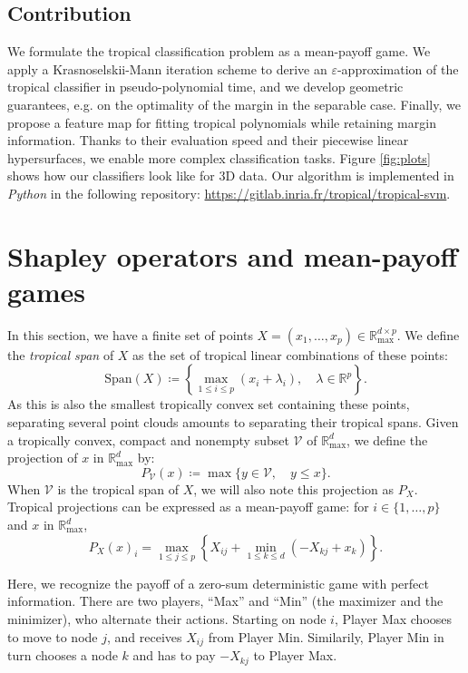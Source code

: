 \documentclass[oneside,UKenglish,a4paper]{amsart}
\numberwithin{equation}{section}
\numberwithin{figure}{section}
\theoremstyle{plain}
\theoremstyle{definition}
\theoremstyle{plain}
\theoremstyle{remark}
\theoremstyle{plain}
\theoremstyle{definition}
\theoremstyle{definition}
\begin{document}
\subsection*{Contribution}

We formulate the tropical classification problem as a mean-payoff game. We apply a Krasnoselskii-Mann iteration scheme to derive an $\varepsilon$-approximation of the tropical classifier in pseudo-polynomial time, and we develop geometric guarantees, e.g. on the optimality of the margin in the separable case. Finally, we propose a feature map for fitting tropical polynomials while retaining margin information. Thanks to their evaluation speed and their piecewise linear hypersurfaces, we enable more complex classification tasks. Figure \ref{fig:plots} shows how our classifiers look like for 3D data. Our algorithm is implemented in \emph{Python} in the following repository: \url{https://gitlab.inria.fr/tropical/tropical-svm}. 

\section{Shapley operators and mean-payoff games}

In this section, we have a finite set of points $X=(x_{1},\ldots,x_{p})\in\mathbb{R}_{\text{max}}^{d\times p}$.
We define the \emph{tropical span} of $X$ as the set of tropical
linear combinations of these points:
\[
\text{Span}(X)\coloneqq\left\{\max_{1\le i\le p}(x_{i}+\lambda_{i}),\quad\lambda\in\mathbb{R}^{p}\right\}.
\]
As this is also the smallest tropically convex set containing these
points, separating several point clouds amounts to separating their
tropical spans. Given a tropically convex, compact and nonempty subset $\mathcal{V}$
of $\mathbb{R}_{\max}^{d}$, we define the projection of
$x$ in $\mathbb{R}_{\max}^{d}$ by:
\[
P_{\mathcal{V}}(x)\coloneqq\max\{y\in \mathcal{V},\quad y\le x\}.
\]
When $\mathcal{V}$ is the tropical span of $X$, we will also note
this projection as $P_{X}$. Tropical projections
can be expressed as a mean-payoff game: for $i\in\{1,\ldots, p\}$ and $x$ in $\mathbb{R}_{\max}^{d}$,   \cite{Maclagan2015}
\begin{equation*}
P_{X}(x)_{i}=\max_{1\le j\le p}\left\{X_{ij}+\min_{1\le k \le d}(-X_{kj}+x_{k})\right\}.
\end{equation*}

Here, we recognize the payoff of a zero-sum deterministic game with perfect
information. There are two players, ``Max'' and ``Min'' (the maximizer
and the minimizer), who alternate their actions. Starting on node
$i$, Player Max chooses to move to node $j$, and receives $X_{ij}$
from Player Min. Similarily, Player Min in turn chooses a node $k$
and has to pay $-X_{kj}$ to Player Max.
\end{document}
